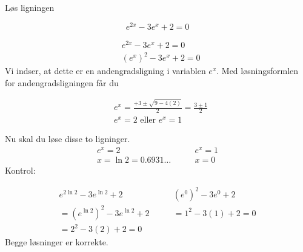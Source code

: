\begin{example} Løs ligningen

\[
e^{2 x}-3 e^x+2=0
\]

\begin{solution}

\[
\begin{aligned}
& e^{2 x}-3 e^x+2=0 \\
& \left(e^x\right)^2-3 e^x+2=0
\end{aligned}
\]
Vi indser, at dette er en andengradsligning i variablen $e^x$. Med løsningsformlen for andengradsligningen får du

\[
\begin{aligned}
& e^x=\frac{+3 \pm \sqrt{9-4(2)}}{2}=\frac{3 \pm 1}{2} \\
& e^x=2 \text { eller } e^x=1
\end{aligned}
\]


Nu skal du løse disse to ligninger.
\[
\begin{array}{ll}
e^x=2 & \qquad e^x=1 \\
x=\ln 2=0.6931 \ldots & \qquad x=0
\end{array}
\]
Kontrol:

\[
\begin{array}{ll}
e^{2 \ln 2}-3 e^{\ln 2}+2 & \qquad \left(e^0\right)^2-3 e^0+2 \\
=\left(e^{\ln 2}\right)^2-3 e^{\ln 2}+2 & \qquad =1^2-3(1)+2=0 \\
=2^2-3(2)+2=0 &
\end{array}
\]
Begge løsninger er korrekte.
\end{solution}  
\end{example}

\newpage

